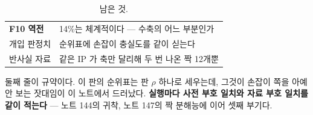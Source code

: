 \documentclass[10pt]{article}
\begin{document}
\begin{table}[t]
\centering\tsize
\caption{남은 것.}
\begin{tabular}{ll}
\toprule
\textbf{F10 역전} & 14\%는 체계적이다 --- 수축의 어느 부분인가 \\
개입 판정치 & 순위표에 손잡이 충실도를 같이 싣는다 \\
반사실 자료 & 같은 IP 가 축만 달리해 두 번 나온 짝 12개뿐 \\
\bottomrule
\end{tabular}
\end{table}

둘째 줄이 규약이다. 이 판의 순위표는 판 $\rho$ 하나로 세우는데, 그것이
손잡이 쪽을 아예 안 보는 잣대임이 이 노트에서 드러났다. \textbf{실행마다
사전 부호 일치와 자료 부호 일치를 같이 적는다} --- 노트 144의 귀착, 노트
147의 짝 분해능에 이어 셋째 부기다.
\end{document}
